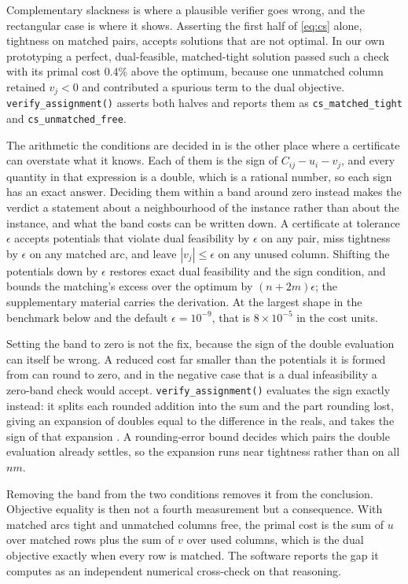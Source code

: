 Complementary slackness is where a plausible verifier goes wrong, and the
rectangular case is where it shows. Asserting the first half of \eqref{eq:cs}
alone, tightness on matched pairs, accepts solutions that are not optimal. In our own prototyping a perfect, dual-feasible, matched-tight solution passed
such a check with its primal cost 0.4\% above the optimum, because one
unmatched column retained \(v_j < 0\) and contributed a spurious term to the
dual objective. \texttt{verify\_assignment()} asserts both halves and reports them as
\texttt{cs\_matched\_tight} and \texttt{cs\_unmatched\_free}.

The arithmetic the conditions are decided in is the other place where a
certificate can overstate what it knows. Each of them is the sign of
\(C_{ij} - u_i - v_j\), and every quantity in that expression is a double, which
is a rational number, so each sign has an exact answer. Deciding them within a band around zero instead makes the verdict a statement
about a neighbourhood of the instance rather than about the instance, and what
the band costs can be written down. A certificate at tolerance \(\epsilon\)
accepts potentials that violate dual feasibility by \(\epsilon\) on any pair, miss
tightness by \(\epsilon\) on any matched arc, and leave \(|v_j| \le \epsilon\) on any
unused column. Shifting the potentials down by \(\epsilon\) restores exact dual
feasibility and the sign condition, and bounds the matching's excess over the
optimum by \((n + 2m)\epsilon\); the supplementary material carries the
derivation. At the largest shape in the benchmark below and the default
\(\epsilon = 10^{-9}\), that is \(8 \times 10^{-5}\) in the cost units.

Setting the band to zero is not the fix, because the sign of the double evaluation can itself be wrong. A reduced cost far smaller than the potentials
it is formed from can round to zero, and in the negative case that is a dual
infeasibility a zero-band check would accept. \texttt{verify\_assignment()} evaluates
the sign exactly instead: it splits each rounded addition into the sum and the
part rounding lost, giving an expansion of doubles equal to the difference in
the reals, and takes the sign of that expansion \citep{Shewchuk1997}. A
rounding-error bound decides which pairs the double evaluation already settles,
so the expansion runs near tightness rather than on all \(nm\).

Removing the band from the two conditions removes it from the conclusion.
Objective equality is then not a fourth measurement but a consequence. With matched arcs tight and unmatched columns free, the primal cost is the sum of
\(u\) over matched rows plus the sum of \(v\) over used columns, which is the dual
objective exactly when every row is matched. The software reports the gap it
computes as an independent numerical cross-check on that reasoning.

